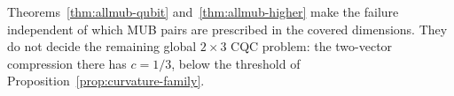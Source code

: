 Theorems~\ref{thm:allmub-qubit} and~\ref{thm:allmub-higher}
make the failure independent of which MUB pairs are prescribed in
the covered dimensions.  They do not decide the remaining global
$2\times3$ CQC problem: the two-vector compression there has
$c=1/3$, below the threshold of
Proposition~\ref{prop:curvature-family}.
